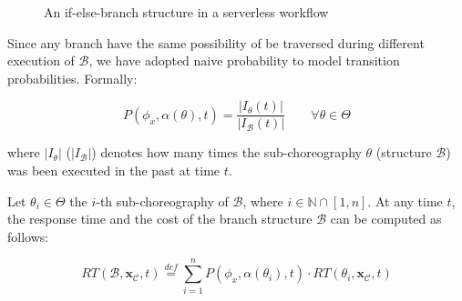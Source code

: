 \documentclass[12pt,a4paper]{report}
\newcommand{\mathDef}{\overset{\textit{def}}{=}}
\newcommand{\N}{\mathbb{N}}
\begin{document}
\begin{figure}
	\caption{An if-else-branch structure in a serverless workflow}
\end{figure}

Since any branch have the same possibility of be traversed during different execution of $\mathcal{B}$, we have adopted naive probability to model transition probabilities. Formally:

\begin{equation}\label{naiveProbability}
	P(\phi_x, \alpha(\theta),t) = \dfrac{|I_{\theta}(t)|}{|I_{\mathcal{B}}(t)|} \qquad \forall \theta \in \Theta
\end{equation}

where $|I_{\theta}|$ ($|I_{\mathcal{B}}|$) denotes how many times the sub-choreography $\theta$ (structure $\mathcal{B}$) was been executed in the past at time $t$.

Let $\theta_i \in \Theta$ the $i$-th sub-choreography of $\mathcal{B}$, where $i \in \N \cap \left[1,n\right]$. At any time $t$, the response time and the cost of the branch structure $\mathcal{B}$ can be computed as follows:

\begin{equation}
	RT(\mathcal{B},\textbf{x}_{\mathcal{C}}, t) \mathDef \sum_{i = 1}^n P(\phi_{x}, \alpha(\theta_i),t) \cdot  RT(\theta_i,\textbf{x}_{\mathcal{C}}, t)
\end{equation}
\end{document}
